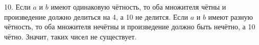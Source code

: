 10. Если $a$ и $b$ имеют одинаковую чётность, то оба множителя чётны и произведение должно делиться на 4, а 10 не делится. Если
$a$ и $b$ имеют разную чётность, то оба множителя нечётны и произведение должно быть нечётно, а 10 чётно. Значит, таких чисел не существует.\\
